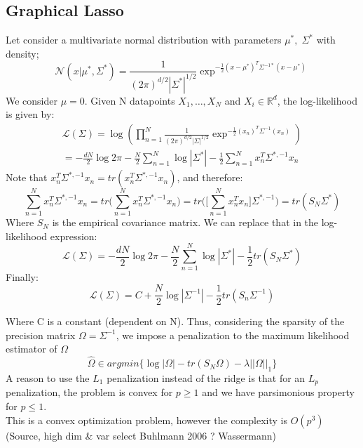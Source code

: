 \documentclass[a4paper,12pt]{article}
\let\bb\mathbb       %
\def\RR{{\bb R}}\def\ZZ{{\bb Z}}\def\FF{{\bb F}}\def\DD{{\bb D}}
\def\bb{\mathbb}
\def\hat{\widehat}
\begin{document}
\subsection{Graphical Lasso}
Let consider a multivariate normal distribution with parameters $\mu^*,\; \Sigma^*$ with density;
\begin{equation}
\mathcal N(x|\mu^*,\Sigma^*)
=\frac{1}{(2\pi)^{d/2}|\Sigma^*|^{1/2}}\exp^{-\frac{1}{2}(x-\mu^*)^T\Sigma^{-1*}(x-\mu^*)}
\end{equation}
We consider $\mu=0$. Given N datapoints $X_1,\dots,X_N$ and $X_i \in \RR^d$, the log-likelihood is given by:
\begin{equation}
\begin{split}
\mathcal{L}(\Sigma)=\log\left(\prod_{n=1}^N\frac{1}{(2\pi)^{d/2}|\Sigma|^{1/2}}\exp^{-\frac{1}{2}(x_n)^T\Sigma^{-1}(x_n)}\right)\\
=-\frac{dN}{2}\log 2\pi - \frac{N}{2}\sum_{n=1}^N\log |\Sigma^*|- \frac{1}{2}\sum_{n=1}^N x_n^T\Sigma^{*,-1}x_n
\end{split}
\end{equation}
Note that $x_n^T\Sigma^{*,-1}x_n=tr(x_n^T\Sigma^{*,-1}x_n)$, and therefore:
\begin{equation}
\sum_{n=1}^N x_n^T\Sigma^{*,-1}x_n=tr\big(\sum_{n=1}^N x_n^T\Sigma^{*,-1}x_n\big)=tr\Big(\big[\sum_{n=1}^N x_n^Tx_n\big]\Sigma^{*,-1}\Big)=tr(S_N\Sigma^*)
\end{equation}
Where $S_N$ is the empirical covariance matrix. We can replace that in the log-likelihood expression:
\begin{equation}
\mathcal{L}(\Sigma)=-\frac{dN}{2}\log 2\pi - \frac{N}{2}\sum_{n=1}^N\log |\Sigma^*|- \frac{1}{2}tr(S_N\Sigma^*)
\end{equation}
Finally:
\begin{equation}
\mathcal{L}(\Sigma)=C+\frac{N}{2}\log|\Sigma^{-1}|-\frac{1}{2} tr(S_n\Sigma^{-1})
\end{equation}

Where C is a constant (dependent on N). Thus, considering the sparsity of the precision matrix $\Omega=\Sigma^{-1}$, we impose a penalization to the maximum likelihood estimator of $\Omega$
\begin{equation}
\hat\Omega\in argmin\big\{ \log|\Omega|-tr(S_N\Omega)-\lambda||\Omega||_1   \big\}
\end{equation}
A reason to use the $L_1$ penalization instead of the ridge is that for an $L_p$ penalization, the problem is convex for $p\geq 1$ and we have parsimonious property for $p\leq 1$.\\
This is a convex optimization problem, however the complexity is $O(p^3)$ (Source, high dim \& var select Buhlmann 2006 ? Wassermann)
\end{document}
